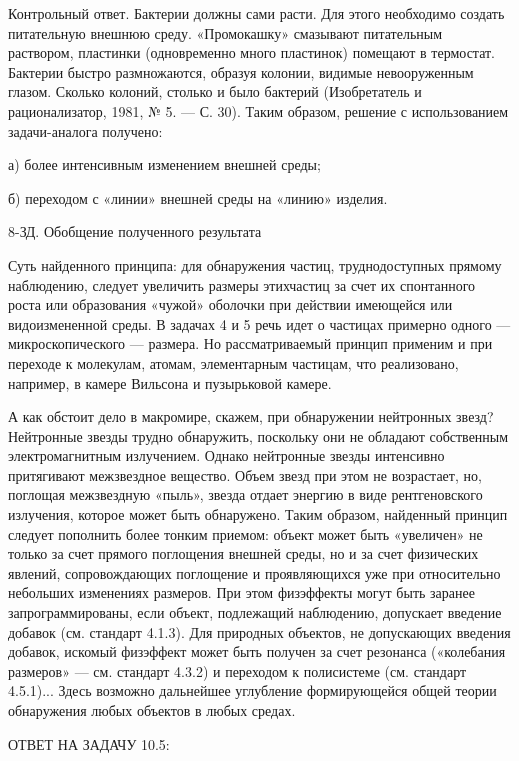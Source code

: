 Контрольный ответ.  Бактерии должны  сами расти. Для  этого необходимо
создать питательную внешнюю  среду. «Промокашку» смазывают питательным
раствором,  пластинки   (одновременно  много  пластинок)   помещают  в
термостат.  Бактерии  быстро  размножаются, образуя  колонии,  видимые
невооруженным  глазом.  Сколько  колоний,   столько  и  было  бактерий
(Изобретатель и  рационализатор, 1981, №  5. — С. 30).  Таким образом,
решение с использованием задачи-аналога получено:

а) более интенсивным изменением внешней среды;

б) переходом с «линии» внешней среды на «линию» изделия.


8-ЗД. Обобщение полученного результата

Суть  найденного  принципа:  для обнаружения  частиц,  труднодоступных
прямому наблюдению,  следует увеличить  размеры этихчастиц за  счет их
спонтанного  роста  или  образования  «чужой»  оболочки  при  действии
имеющейся  или  видоизмененной  среды.  В  задачах 4  и  5  речь  идет
о  частицах   примерно  одного  —  микроскопического   —  размера.  Но
рассматриваемый принцип  применим и при переходе  к молекулам, атомам,
элементарным частицам, что реализовано,  например, в камере Вильсона и
пузырьковой камере.

А как  обстоит дело  в макромире,  скажем, при  обнаружении нейтронных
звезд? Нейтронные звезды трудно  обнаружить, поскольку они не обладают
собственным  электромагнитным  излучением.  Однако  нейтронные  звезды
интенсивно притягивают  межзвездное вещество. Объем звезд  при этом не
возрастает, но,  поглощая межзвездную «пыль», звезда  отдает энергию в
виде рентгеновского  излучения, которое  может быть  обнаружено. Таким
образом,  найденный принцип  следует пополнить  более тонким  приемом:
объект  может быть  «увеличен» не  только за  счет прямого  поглощения
внешней  среды,  но  и  за  счет  физических  явлений,  сопровождающих
поглощение и  проявляющихся уже при относительно  небольших изменениях
размеров. При  этом физэффекты  могут быть  заранее запрограммированы,
если объект,  подлежащий наблюдению,  допускает введение  добавок (см.
стандарт  4.1.3).  Для  природных объектов,  не  допускающих  введения
добавок,  искомый  физэффект  может  быть получен  за  счет  резонанса
(«колебания размеров» — см. стандарт  4.3.2) и переходом к полисистеме
(см.   стандарт  4.5.1)...   Здесь   возможно  дальнейшее   углубление
формирующейся общей теории обнаружения любых объектов в любых средах.


ОТВЕТ НА ЗАДАЧУ 10.5:


